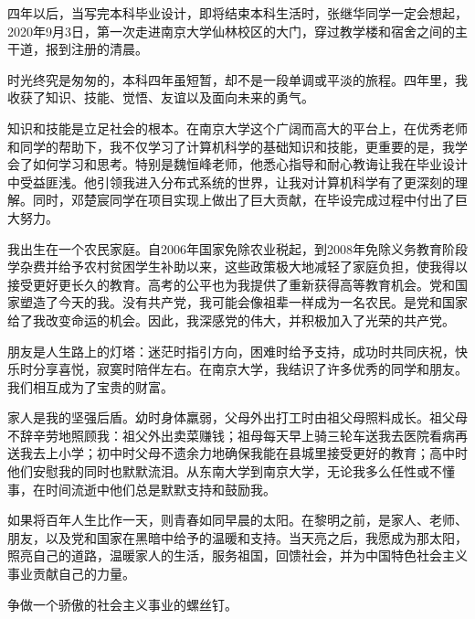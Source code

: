 \documentclass[
    type = bachelor,
    degree = academic,
    twoside,
    fontset = win
]
{njuthesis}
\begin{document}
\begin{acknowledgement}
四年以后，当写完本科毕业设计，即将结束本科生活时，张继华同学一定会想起，2020年9月3日，第一次走进南京大学仙林校区的大门，穿过教学楼和宿舍之间的主干道，报到注册的清晨。

时光终究是匆匆的，本科四年虽短暂，却不是一段单调或平淡的旅程。四年里，我收获了知识、技能、觉悟、友谊以及面向未来的勇气。
    
知识和技能是立足社会的根本。在南京大学这个广阔而高大的平台上，在优秀老师和同学的帮助下，我不仅学习了计算机科学的基础知识和技能，更重要的是，我学会了如何学习和思考。特别是魏恒峰老师，他悉心指导和耐心教诲让我在毕业设计中受益匪浅。他引领我进入分布式系统的世界，让我对计算机科学有了更深刻的理解。同时，邓楚宸同学在项目实现上做出了巨大贡献，在毕设完成过程中付出了巨大努力。
    
我出生在一个农民家庭。自2006年国家免除农业税起，到2008年免除义务教育阶段学杂费并给予农村贫困学生补助以来，这些政策极大地减轻了家庭负担，使我得以接受更好更长久的教育。高考的公平也为我提供了重新获得高等教育机会。党和国家塑造了今天的我。没有共产党，我可能会像祖辈一样成为一名农民。是党和国家给了我改变命运的机会。因此，我深感党的伟大，并积极加入了光荣的共产党。
    
朋友是人生路上的灯塔：迷茫时指引方向，困难时给予支持，成功时共同庆祝，快乐时分享喜悦，寂寞时陪伴左右。在南京大学，我结识了许多优秀的同学和朋友。我们相互成为了宝贵的财富。
    
家人是我的坚强后盾。幼时身体羸弱，父母外出打工时由祖父母照料成长。祖父母不辞辛劳地照顾我：祖父外出卖菜赚钱；祖母每天早上骑三轮车送我去医院看病再送我去上小学；初中时父母不遗余力地确保我能在县城里接受更好的教育；高中时他们安慰我的同时也默默流泪。从东南大学到南京大学，无论我多么任性或不懂事，在时间流逝中他们总是默默支持和鼓励我。

如果将百年人生比作一天，则青春如同早晨的太阳。在黎明之前，是家人、老师、朋友，以及党和国家在黑暗中给予的温暖和支持。当天亮之后，我愿成为那太阳，照亮自己的道路，温暖家人的生活，服务祖国，回馈社会，并为中国特色社会主义事业贡献自己的力量。

争做一个骄傲的社会主义事业的螺丝钉。
\end{acknowledgement}
\end{document}
